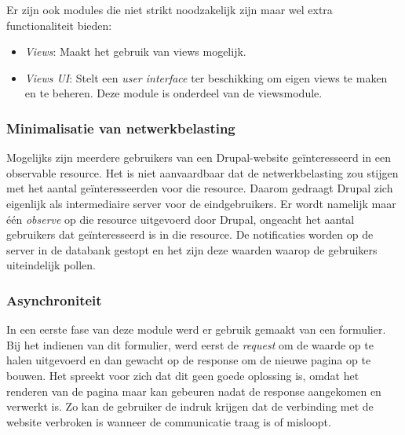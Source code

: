 \noindent
Er zijn ook modules die niet strikt noodzakelijk zijn maar wel extra functionaliteit bieden:
\begin{itemize}
\item \textit{Views}\cite{viewsModule}: Maakt het gebruik van views mogelijk.
\item \textit{Views UI}: Stelt een \textit{user interface} ter beschikking om eigen views te maken en te beheren. Deze module is onderdeel van de viewsmodule.
\end{itemize}

\subsubsection{Minimalisatie van netwerkbelasting}
Mogelijks zijn meerdere gebruikers van een Drupal-website ge\"{i}nteresseerd in een observable resource. Het is niet aanvaardbaar dat de netwerkbelasting zou stijgen met het aantal ge\"{i}nteresseerden voor die resource. Daarom gedraagt Drupal zich eigenlijk als intermediaire server voor de eindgebruikers. Er wordt namelijk maar \'{e}\'{e}n \textit{observe} op die resource uitgevoerd door Drupal, ongeacht het aantal gebruikers dat ge\"{i}nteresseerd is in die resource. De notificaties worden op de server in de databank gestopt en het zijn deze waarden waarop de gebruikers uiteindelijk pollen. %

\subsubsection{Asynchroniteit}
In een eerste fase van deze module werd er gebruik gemaakt van een formulier. Bij het indienen van dit formulier, werd eerst de \textit{request} om de waarde op te halen uitgevoerd en dan gewacht op de response om de nieuwe pagina op te bouwen. Het spreekt voor zich dat dit geen goede oplossing is, omdat het renderen van de pagina maar kan gebeuren nadat de response aangekomen en verwerkt is. Zo kan de gebruiker de indruk krijgen dat de verbinding met de website verbroken is wanneer de communicatie traag is of misloopt. \\

